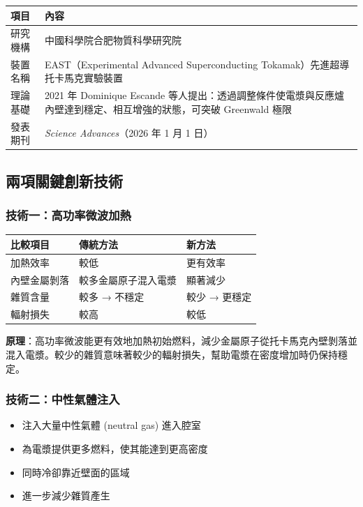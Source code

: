 \documentclass[11pt,a4paper]{article}
\begin{document}
\begin{longtable}{p{3.5cm}p{10.5cm}}
\toprule
\textbf{項目} & \textbf{內容} \\
\midrule
\endfirsthead
\bottomrule
\endfoot
研究機構 & 中國科學院合肥物質科學研究院 \\
\midrule
裝置名稱 & EAST（Experimental Advanced Superconducting Tokamak）\newline 先進超導托卡馬克實驗裝置 \\
\midrule
理論基礎 & 2021 年 Dominique Escande 等人提出：透過調整條件使電漿與反應爐內壁達到穩定、相互增強的狀態，可突破 Greenwald 極限 \\
\midrule
發表期刊 & \textit{Science Advances}（2026 年 1 月 1 日） \\
\bottomrule
\end{longtable}

\subsection{兩項關鍵創新技術}

\subsubsection{技術一：高功率微波加熱}

\begin{longtable}{p{5cm}p{4cm}p{4.5cm}}
\toprule
\textbf{比較項目} & \textbf{傳統方法} & \textbf{新方法} \\
\midrule
\endfirsthead
\bottomrule
\endfoot
加熱效率 & 較低 & 更有效率 \\
\midrule
內壁金屬剝落 & 較多金屬原子混入電漿 & 顯著減少 \\
\midrule
雜質含量 & 較多 → 不穩定 & 較少 → 更穩定 \\
\midrule
輻射損失 & 較高 & 較低 \\
\bottomrule
\end{longtable}

\textbf{原理}：高功率微波能更有效地加熱初始燃料，減少金屬原子從托卡馬克內壁剝落並混入電漿。較少的雜質意味著較少的輻射損失，幫助電漿在密度增加時仍保持穩定。

\subsubsection{技術二：中性氣體注入}

\begin{itemize}[leftmargin=*,itemsep=2pt]
    \item 注入大量中性氣體 (neutral gas) 進入腔室
    \item 為電漿提供更多燃料，使其能達到更高密度
    \item 同時冷卻靠近壁面的區域
    \item 進一步減少雜質產生
\end{itemize}
\end{document}
